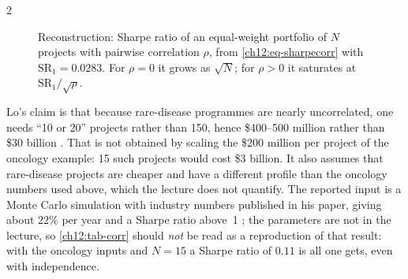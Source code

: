 \begin{paracol}{2}
\begin{figure}[ht]
\centering
{}
\caption{Reconstruction: Sharpe ratio of an equal-weight portfolio of $N$ projects with pairwise correlation $\rho$,
from \eqref{ch12:eq-sharpecorr} with $\mathrm{SR}_1=0.0283$. For $\rho=0$ it grows as $\sqrt N$; for $\rho>0$ it saturates
at $\mathrm{SR}_1/\sqrt\rho$.}\label{ch12:fig-sharpe}
\end{figure}

\begin{coursenote}
Lo's claim is that because rare-disease programmes are nearly uncorrelated, one needs ``10 or 20''
projects rather than 150, hence \$400--500 million rather than \$30 billion . That is not obtained by scaling the
\$200 million per project of the oncology example: 15 such projects would cost \$3 billion. It also assumes that rare-disease
projects are cheaper and have a different profile than the oncology numbers used above, which the lecture does
not quantify. The reported input is a Monte Carlo simulation with industry numbers published in his paper,
giving about $22\%$ per year and a Sharpe ratio above~1 ; the parameters are not in the
lecture, so \cref{ch12:tab-corr} should \emph{not} be read as a reproduction of that result: with the oncology
inputs and $N=15$ a Sharpe ratio of $0.11$ is all one gets, even with independence.
\end{coursenote}


\end{paracol}
